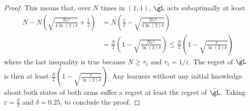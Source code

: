 \begin{proof}
    This means that, over $N$ times in $(1,1)$, $\bar{\gL}$ acts suboptimally at least
    \begin{align*}
        N -N\left(\sqrt{\frac{N\varepsilon^2}{4\ln(2)\delta}}+\frac12\right)
        &= N\left(\frac12-\sqrt{\frac{N\varepsilon^2}{4\ln(2)\delta}}\right) \\
        &= \frac{N}2 \left(1-\sqrt{\frac{N\varepsilon^2}{\ln(2)\delta}}\right)\le \frac{N}2 \left(1-\sqrt{\frac{\varepsilon}{\ln(2)\delta}}\right)%
    \end{align*}
    where the last inequality is true because $N\ge \tau_1$ and $\tau_1=1/\varepsilon$.
    The regret of $\bar{\gL}$ is then at least $\frac{N}2 \left(1-\sqrt{\frac{\varepsilon}{\ln(2)\delta}}\right)$. %
    Any learners without any initial knowledge about both states of both arms suffer a regret at least the regret of $\bar{\gL}$.
    Taking $\varepsilon=\frac{\delta}{T}$ and $\delta=0.25$, to conclude the proof.


\end{proof}
